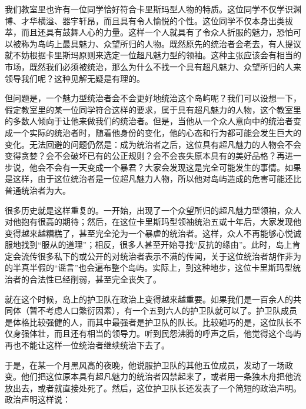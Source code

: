 我们教室里也许有一位同学恰好符合卡里斯玛型人物的特质。这位同学不仅学识渊博、才华横溢、器宇轩昂，而且具有令人愉悦的个性。这位同学不仅本身出类拔萃，而且还具有鼓舞人心的力量。这样一个人就具有了令众人折服的魅力，恐怕可以被称为岛屿上最具魅力、众望所归的人物。既然原先的统治者会老去，有人提议就不妨根据卡里斯玛原则来选定一位超凡魅力型的领袖。这种主张应该会有相当的市场，既然我们必须被统治，那么为什么不找一个具有超凡魅力、众望所归的人来领导我们呢？这种见解无疑是有理的。

但问题是，一个魅力型统治者会不会更好地统治这个岛屿呢？我们可以设想一下，假定教室里的某一位同学符合这样的要求，属于具有超凡魅力的人物，这个教室里的多数人倾向于让他来做我们的统治者。但是，当他从一个众人意向中的统治者变成一个实际的统治者时，随着他身份的变化，他的心态和行为都可能会发生巨大的变化。无法回避的问题仍然是：成为统治者之后，这位具有超凡魅力的人物会不会变得贪婪？会不会破坏已有的公正规则？会不会丧失原本具有的美好品格？再进一步说，他会不会有一天变成一个暴君？大家会发现这是完全可能发生的事情。如果是这样，由于这位统治者是一位超凡魅力人物，所以他对岛屿造成的危害可能还比普通统治者为大。

很多历史就是这样重复的。一开始，出现了一个众望所归的超凡魅力型领袖，众人对他抱有很高的期待；然后，在这位卡里斯玛型领袖统治五或十年后，大家发现他变得越来越糟糕了，甚至完全沦为一个暴虐的统治者。这样，众人不再能够心悦诚服地找到“服从的道理”；相反，很多人甚至开始寻找“反抗的缘由”。此时，岛上肯定会流传很多私下的或公开的对统治者表示不满的传闻，关于这位统治者胡作非为的半真半假的“谣言”也会遍布整个岛屿。实际上，到这种地步，这位卡里斯玛型统治者的合法性已经削弱，甚至完全丧失了。

就在这个时候，岛上的护卫队在政治上变得越来越重要。如果我们是一百余人的共同体（暂不考虑人口繁衍因素），有一个五到六人的护卫队就可以了。护卫队成员是体格比较强健的人，而其中最强者是护卫队的队长。比较碰巧的是，这位队长不仅身强体壮，而且还有相当的领导力。听到民怨沸腾的呼声之后，他觉得这个岛屿再也不能让这样一位统治者继续统治下去了。

于是，在某一个月黑风高的夜晚，他说服护卫队的其他五位成员，发动了一场政变。他们把这位原本具有超凡魅力的统治者囚禁起来了，或者用一条独木舟把他流放出去，或者就直接处死了。然后，这位护卫队长还发表了一个简短的政治声明。政治声明这样说：



